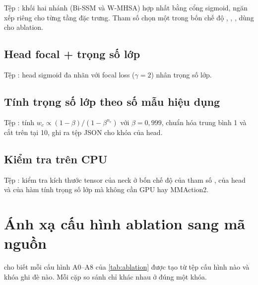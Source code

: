 Tệp : khối hai nhánh (Bi-SSM và W-MHSA) hợp nhất bằng cổng sigmoid, ngăn xếp riêng cho từng tầng đặc trưng. Tham số  chọn một trong bốn chế độ , , ,  dùng cho ablation.


\section{Head focal + trọng số lớp}

Tệp : head sigmoid đa nhãn với focal loss ($\gamma = 2$) nhân trọng số lớp.


\section{Tính trọng số lớp theo số mẫu hiệu dụng}

Tệp : tính $w_c \propto (1-\beta)/(1-\beta^{n_c})$ với $\beta = 0{,}999$, chuẩn hóa trung bình 1 và cắt trên tại 10, ghi ra tệp JSON cho khóa  của head.


\section{Kiểm tra trên CPU}

Tệp : kiểm tra kích thước tensor của neck ở bốn chế độ của tham số , của head và của hàm tính trọng số lớp mà không cần GPU hay MMAction2.


\chapter{Ánh xạ cấu hình ablation sang mã nguồn}
\label{app:ablation-map}

 cho biết mỗi cấu hình A0--A8 của \cref{tab:ablation} được tạo từ tệp cấu hình nào và khóa ghi đè nào. Mỗi cặp so sánh chỉ khác nhau ở đúng một khóa.

